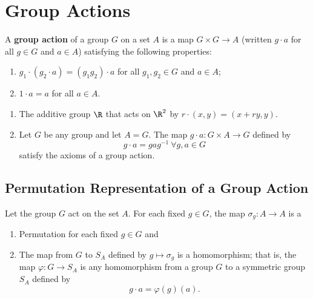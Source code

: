 \section{Group Actions}

\begin{definition}
    A \textbf{group action} of a group \( G  \) on a set \( A  \) is a map \( G \times G \to A  \) (written \( g \cdot a  \) for all \( g \in G  \) and \(  a \in A  \)) satisfying the following properties:
    \begin{enumerate}
        \item[(1)] \( {g}_{1} \cdot ({g}_{2} \cdot a) = ({g}_{1} {g}_{2}) \cdot a  \) for all \( {g}_{1}, {g}_{2} \in G  \) and \( a \in A  \);
    \item[(2)] \( 1 \cdot a = a  \) for all \( a \in A \).
    \end{enumerate}
\end{definition}

\begin{eg}
   \begin{enumerate}
       \item[(1)] The additive group \( \R  \) that acts on \( \R^{2} \) by \( r \cdot (x,y) = (x + ry, y) \). 
        \item[(2)] Let \( G  \) be any group and let \( A = G  \). The map \( g \cdot a : G \times A \to G  \) defined by
            \[  g \cdot a = g a g^{-1} \ \forall g, a \in G  \]
            satisfy the axioms of a group action.
   \end{enumerate} 
\end{eg}

\subsection{Permutation Representation of a Group Action}

Let the group \( G \) act on the set \( A  \). For each fixed \( g \in G  \), the map \( {\sigma}_{g} : A \to A  \) is a  
\begin{enumerate}
    \item[(1)] Permutation for each fixed \( g \in G  \) and
    \item[(2)] The map from \( G \) to \( {S}_{A} \) defined by \( g \mapsto {\sigma}_{g}  \) is a homomorphism; that is, the map \( \varphi : G \to {S}_{A} \) is any homomorphism from a group \( G  \) to a symmetric group \( {S}_{A} \) defined by
        \[  g \cdot a = \varphi(g)(a). \]
\end{enumerate}

